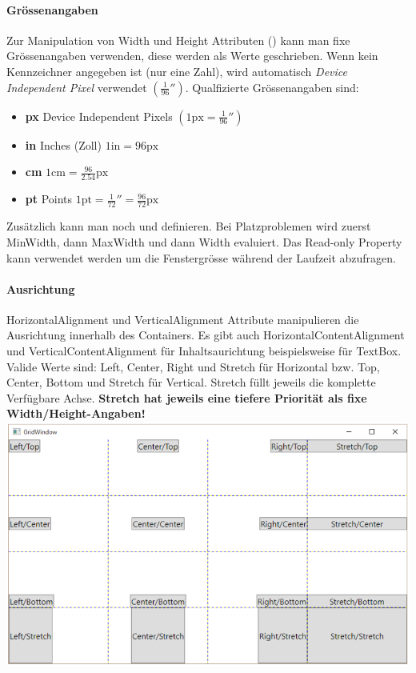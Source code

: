 \paragraph{Grössenangaben} Zur Manipulation von Width und Height Attributen () kann man fixe Grössenangaben verwenden, diese werden als  Werte geschrieben. Wenn kein Kennzeichner angegeben ist (nur eine Zahl), wird automatisch \textit{Device Independent Pixel} verwendet $\left(\frac{1}{96}''\right)$. Qualfizierte Grössenangaben sind:
\begin{itemize}
\item \textbf{px} Device Independent Pixels $\left(1\text{px} = \frac{1}{96}''\right)$
\item \textbf{in} Inches (Zoll) $1\text{in} = 96\text{px}$
\item \textbf{cm} $1\text{cm} = \frac{96}{2.54}\text{px}$
\item \textbf{pt} Points $1\text{pt} = \frac{1}{72}'' = \frac{96}{72}\text{px}$
\end{itemize}
Zusätzlich kann man noch  und  definieren. Bei Platzproblemen wird zuerst MinWidth, dann MaxWidth und dann Width evaluiert. Das Read-only Property  kann verwendet werden um die Fenstergrösse während der Laufzeit abzufragen. 


\paragraph{Ausrichtung} HorizontalAlignment und VerticalAlignment Attribute manipulieren die Ausrichtung innerhalb des Containers. Es gibt auch HorizontalContentAlignment und VerticalContentAlignment für Inhaltsaurichtung beispielsweise für TextBox. \\
Valide Werte sind: Left, Center, Right und Stretch für Horizontal bzw. Top, Center, Bottom und Stretch für Vertical. Stretch füllt jeweils die komplette Verfügbare Achse. \textbf{Stretch hat jeweils eine tiefere Priorität als fixe Width/Height-Angaben!}
\includegraphics[scale=0.25]{img/ausrichtung.png}



